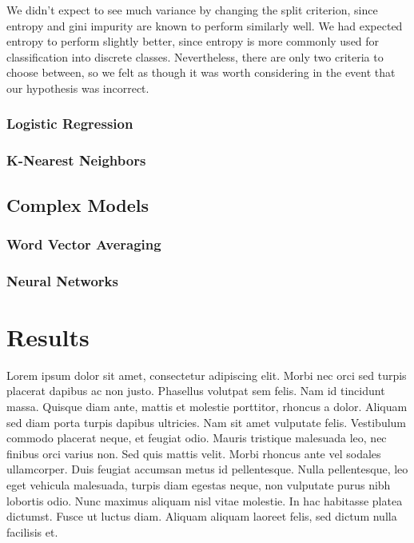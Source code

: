 \documentclass[conference]{IEEEtran}
\begin{document}
We didn't expect to see much variance by changing the split criterion, since entropy and gini impurity are known to perform similarly well. We had expected entropy to perform slightly better, since entropy is more commonly used for classification into discrete classes. Nevertheless, there are only two criteria to choose between, so we felt as though it was worth considering in the event that our hypothesis was incorrect.

\subsubsection{Logistic Regression}


\subsubsection{K-Nearest Neighbors}


\subsection{Complex Models}


\subsubsection{Word Vector Averaging}


\subsubsection{Neural Networks}

\section{Results}

Lorem ipsum dolor sit amet, consectetur adipiscing elit. Morbi nec orci sed turpis placerat dapibus ac non justo. Phasellus volutpat sem felis. Nam id tincidunt massa. Quisque diam ante, mattis et molestie porttitor, rhoncus a dolor. Aliquam sed diam porta turpis dapibus ultricies. Nam sit amet vulputate felis. Vestibulum commodo placerat neque, et feugiat odio. Mauris tristique malesuada leo, nec finibus orci varius non. Sed quis mattis velit. Morbi rhoncus ante vel sodales ullamcorper. Duis feugiat accumsan metus id pellentesque. Nulla pellentesque, leo eget vehicula malesuada, turpis diam egestas neque, non vulputate purus nibh lobortis odio. Nunc maximus aliquam nisl vitae molestie. In hac habitasse platea dictumst. Fusce ut luctus diam. Aliquam aliquam laoreet felis, sed dictum nulla facilisis et.
\end{document}
